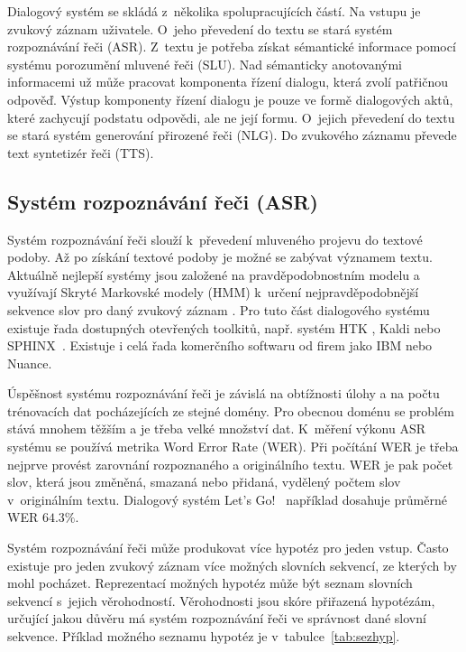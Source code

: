 Dialogový systém se skládá z~několika spolupracujících částí.
Na vstupu je zvukový záznam uživatele.
O~jeho převedení do textu se stará systém rozpoznávání řeči (ASR).
Z~textu je potřeba získat sémantické informace pomocí systému porozumění mluvené řeči (SLU).
Nad sémanticky anotovanými informacemi už může pracovat komponenta řízení dialogu, která zvolí patřičnou odpověď.
Výstup komponenty řízení dialogu je pouze ve formě dialogových aktů, které zachycují podstatu odpovědi, ale ne její formu.
O~jejich převedení do textu se stará systém generování přirozené řeči (NLG).
Do zvukového záznamu převede text syntetizér řeči (TTS).

\subsection{Systém rozpoznávání řeči (ASR)}

Systém rozpoznávání řeči slouží k~převedení mluveného projevu do textové podoby.
Až po získání textové podoby je možné se zabývat významem textu.
Aktuálně nejlepší systémy jsou založené na pravděpodobnostním modelu a využívají Skryté Markovské modely (HMM) k~určení nejpravděpodobnější sekvence slov pro daný zvukový záznam \cite{juang1991hidden}.
Pro tuto část dialogového systému existuje řada dostupných otevřených toolkitů, např. systém HTK \cite{young2002htk}, Kaldi \cite{Povey_ASRU2011} nebo SPHINX~\cite{walker2004sphinx}.
Existuje i celá řada komerčního softwaru od firem jako IBM nebo Nuance.

Úspěšnost systému rozpoznávání řeči je závislá na obtížnosti úlohy a na počtu trénovacích dat pocházejících ze stejné domény.
Pro obecnou doménu se problém stává mnohem těžším a je třeba velké množství dat.
K~měření výkonu ASR systému se používá metrika Word Error Rate (WER).
Při počítání WER je třeba nejprve provést zarovnání rozpoznaného a originálního textu.
WER je pak počet slov, která jsou změněná, smazaná nebo přidaná, vydělený počtem slov v~originálním textu.
Dialogový systém Let's Go!~\cite{raux2006doing} například dosahuje průměrné WER $64.3\%$.

Systém rozpoznávání řeči může produkovat více hypotéz pro jeden vstup.
Často existuje pro jeden zvukový záznam více možných slovních sekvencí, ze kterých by mohl pocházet.
Reprezentací možných hypotéz může být seznam slovních sekvencí s~jejich věrohodností.
Věrohodnosti jsou skóre přiřazená hypotézám, určující jakou důvěru má systém rozpoznávání řeči ve správnost dané slovní sekvence.
Příklad možného seznamu hypotéz je v~tabulce~\ref{tab:sezhyp}.

